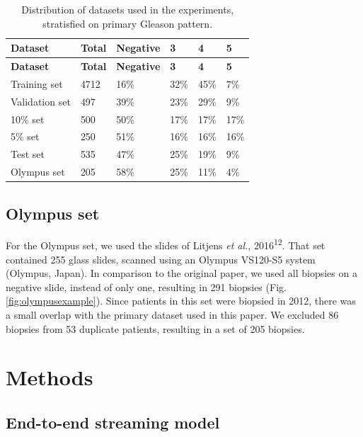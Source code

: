 \documentclass[
  12pt,
  a5,margin=2cmpaper,
]{article}
\begin{document}
\hypertarget{tab:extset}{}
\begin{longtable}[]{@{}llllll@{}}
\caption{Distribution of datasets used in the experiments, stratisfied
on primary Gleason pattern.}\tabularnewline
\toprule\noalign{}
\textbf{Dataset} & \textbf{Total} & \textbf{Negative} & \textbf{3} &
\textbf{4} & \textbf{5} \\
\midrule\noalign{}
\endfirsthead
\toprule\noalign{}
\textbf{Dataset} & \textbf{Total} & \textbf{Negative} & \textbf{3} &
\textbf{4} & \textbf{5} \\
\midrule\noalign{}
\endhead
\bottomrule\noalign{}
\endlastfoot
Training set & 4712 & 16\% & 32\% & 45\% & 7\% \\
Validation set & 497 & 39\% & 23\% & 29\% & 9\% \\
10\% set & 500 & 50\% & 17\% & 17\% & 17\% \\
5\% set & 250 & 51\% & 16\% & 16\% & 16\% \\
Test set & 535 & 47\% & 25\% & 19\% & 9\% \\
Olympus set & 205 & 58\% & 25\% & 11\% & 4\% \\
\end{longtable}

\hypertarget{olympus-set}{%
\subsection{Olympus set}\label{olympus-set}}

For the Olympus set, we used the slides of Litjens \emph{et al.},
2016\textsuperscript{12}. That set contained 255 glass slides, scanned
using an Olympus VS120-S5 system (Olympus, Japan). In comparison to the
original paper, we used all biopsies on a negative slide, instead of
only one, resulting in 291 biopsies (Fig.
\protect\hyperlink{fig:olympusexample}{{[}fig:olympusexample{]}}). Since
patients in this set were biopsied in 2012, there was a small overlap
with the primary dataset used in this paper. We excluded 86 biopsies
from 53 duplicate patients, resulting in a set of 205 biopsies.

\hypertarget{methods}{%
\section{Methods}\label{methods}}

\hypertarget{end-to-end-streaming-model}{%
\subsection{End-to-end streaming
model}\label{end-to-end-streaming-model}}
\end{document}
